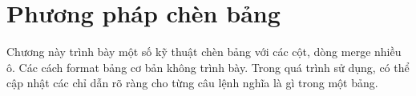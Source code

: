 \chapter{Phương pháp chèn bảng}
\label{chap:chap3-table}

Chương này trình bày một số kỹ thuật chèn bảng với các cột, dòng merge nhiều ô. Các cách format bảng cơ bản không trình bày. Trong quá trình sử dụng, có thể cập nhật các chỉ dẫn rõ ràng cho từng câu lệnh nghĩa là gì trong một bảng.

